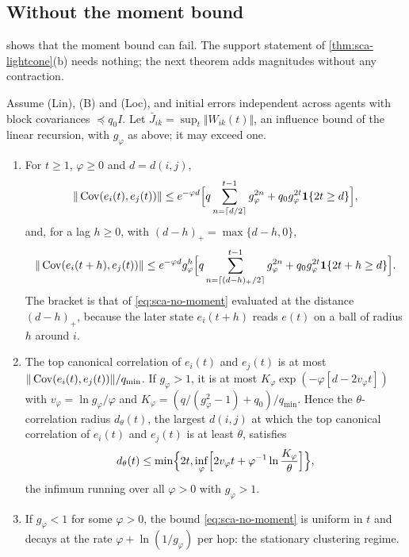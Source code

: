 \subsection{Without the moment bound}\label{sec:sca-nomoment}

 shows that the moment bound can fail. The support statement of \cref{thm:sca-lightcone}(b) needs nothing; the next theorem adds magnitudes without any contraction.

\begin{theorem}\label{thm:sca-no-moment}
Assume \textup{(Lin)}, \textup{(B)} and \textup{(Loc)}, and initial errors independent across agents with block covariances $\preceq q_0I$. Let $\bar J_{ik}=\sup_t\Vert W_{ik}(t)\Vert$, an influence bound of the linear recursion, with $g_\varphi$ as above; it may exceed one.
\begin{enumerate}
\item[(a)] For $t\ge1$, $\varphi\ge0$ and $d=d(i,j)$,
\begin{equation}\label{eq:sca-no-moment}
\Vert\operatorname{Cov}(e_i(t),e_j(t))\Vert\le e^{-\varphi d}\Bigl[q\sum_{n=\lceil d/2\rceil}^{t-1}g_\varphi^{2n}+q_0g_\varphi^{2t}\mathbf{1}\{2t\ge d\}\Bigr],
\end{equation}
and, for a lag $h\ge0$, with $(d-h)_+=\max\{d-h,0\}$,
\begin{equation}\label{eq:sca-no-moment-lag}
\Vert\operatorname{Cov}(e_i(t+h),e_j(t))\Vert\le e^{-\varphi d}g_\varphi^h\Bigl[q\sum_{n=\lceil(d-h)_+/2\rceil}^{t-1}g_\varphi^{2n}+q_0g_\varphi^{2t}\mathbf{1}\{2t+h\ge d\}\Bigr].
\end{equation}
The bracket is that of \eqref{eq:sca-no-moment} evaluated at the distance $(d-h)_+$, because the later state $e_i(t+h)$ reads $e(t)$ on a ball of radius $h$ around $i$.
\item[(b)] The top canonical correlation of $e_i(t)$ and $e_j(t)$ is at most $\Vert\operatorname{Cov}(e_i(t),e_j(t))\Vert/q_{\min}$. If $g_\varphi>1$, it is at most $K_\varphi\exp(-\varphi[d-2v_\varphi t])$ with $v_\varphi=\ln g_\varphi/\varphi$ and $K_\varphi=(q/(g_\varphi^2-1)+q_0)/q_{\min}$. Hence the $\theta$-correlation radius $d_\theta(t)$, the largest $d(i,j)$ at which the top canonical correlation of $e_i(t)$ and $e_j(t)$ is at least $\theta$, satisfies
\begin{equation}\label{eq:sca-radius}
d_\theta(t)\le\min\Bigl\{2t,\inf_{\varphi}\Bigl[2v_\varphi t+\varphi^{-1}\ln\frac{K_\varphi}{\theta}\Bigr]\Bigr\},
\end{equation}
the infimum running over all $\varphi>0$ with $g_\varphi>1$.
\item[(c)] If $g_\varphi<1$ for some $\varphi>0$, the bound \eqref{eq:sca-no-moment} is uniform in $t$ and decays at the rate $\varphi+\ln(1/g_\varphi)$ per hop: the stationary clustering regime.
\end{enumerate}
\end{theorem}
